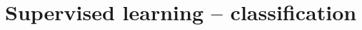 \newpage\section{Supervised learning – classification} \label{section: – Supervised learning – classification}
